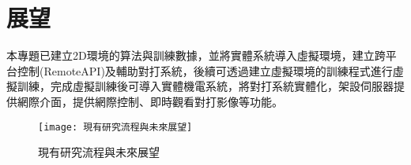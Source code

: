 \chapter{展望}
本專題已建立2D環境的算法與訓練數據，並將實體系統導入虛擬環境，建立跨平台控制(RemoteAPI)及輔助對打系統，後續可透過建立虛擬環境的訓練程式進行虛擬訓練，完成虛擬訓練後可導入實體機電系統，將對打系統實體化，架設伺服器提供網際介面，提供網際控制、即時觀看對打影像等功能。
\begin{figure}[hbt!]
\begin{center}
\texttt{[image: 現有研究流程與未來展望]}
\caption{\Large 現有研究流程與未來展望}
\label{fig.現有研究流程與未來展望}
\end{center}
\end{figure}
